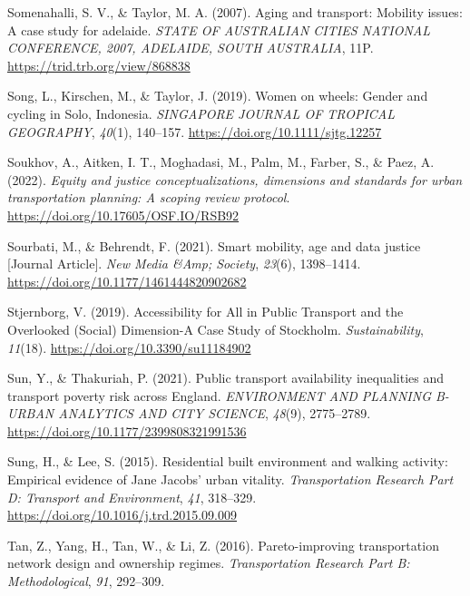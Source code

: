 \documentclass[
  letterpaper,
  DIV=11,
  numbers=noendperiod]{scrartcl}
\newlength{\cslhangindent}
\newenvironment{CSLReferences}[2] %
 {\begin{list}{}{%
  \setlength{\itemindent}{0pt}
  \setlength{\leftmargin}{0pt}
  \setlength{\parsep}{0pt}
  \ifodd #1
   \setlength{\leftmargin}{\cslhangindent}
   \setlength{\itemindent}{-1\cslhangindent}
  \fi
  \setlength{\itemsep}{#2\baselineskip}}}
 {\end{list}}
\begin{document}
\begin{CSLReferences}{1}{0}
Somenahalli, S. V., \& Taylor, M. A. (2007). Aging and transport:
Mobility issues: A case study for adelaide. \emph{{STATE} {OF}
{AUSTRALIAN} {CITIES} {NATIONAL} {CONFERENCE}, 2007, {ADELAIDE}, {SOUTH}
{AUSTRALIA}}, 11P. \url{https://trid.trb.org/view/868838}

Song, L., Kirschen, M., \& Taylor, J. (2019). Women on wheels: {Gender}
and cycling in {Solo}, {Indonesia}. \emph{SINGAPORE JOURNAL OF TROPICAL
GEOGRAPHY}, \emph{40}(1), 140--157.
\url{https://doi.org/10.1111/sjtg.12257}

Soukhov, A., Aitken, I. T., Moghadasi, M., Palm, M., Farber, S., \&
Paez, A. (2022). \emph{Equity and justice conceptualizations, dimensions
and standards for urban transportation planning: A scoping review
protocol}. \url{https://doi.org/10.17605/OSF.IO/RSB92}

Sourbati, M., \& Behrendt, F. (2021). Smart mobility, age and data
justice {[}Journal Article{]}. \emph{New Media \&Amp; Society},
\emph{23}(6), 1398--1414. \url{https://doi.org/10.1177/1461444820902682}

Stjernborg, V. (2019). Accessibility for {All} in {Public Transport} and
the {Overlooked} ({Social}) {Dimension-A Case Study} of {Stockholm}.
\emph{Sustainability}, \emph{11}(18).
\url{https://doi.org/10.3390/su11184902}

Sun, Y., \& Thakuriah, P. (2021). Public transport availability
inequalities and transport poverty risk across {England}.
\emph{ENVIRONMENT AND PLANNING B-URBAN ANALYTICS AND CITY SCIENCE},
\emph{48}(9), 2775--2789. \url{https://doi.org/10.1177/2399808321991536}

Sung, H., \& Lee, S. (2015). Residential built environment and walking
activity: {Empirical} evidence of {Jane Jacobs}' urban vitality.
\emph{Transportation Research Part D: Transport and Environment},
\emph{41}, 318--329. \url{https://doi.org/10.1016/j.trd.2015.09.009}

Tan, Z., Yang, H., Tan, W., \& Li, Z. (2016). Pareto-improving
transportation network design and ownership regimes.
\emph{Transportation Research Part B: Methodological}, \emph{91},
292--309.


\end{CSLReferences}
\end{document}
